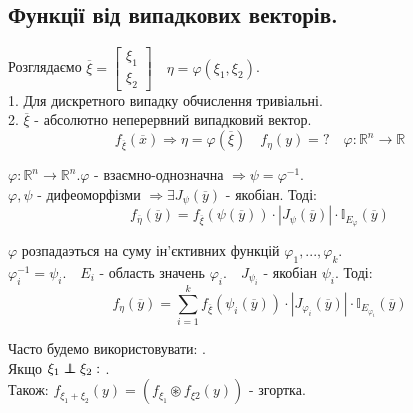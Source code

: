  \subsection{Функції від випадкових векторів.}
 Розглядаємо $ \overline{\xi} = \begin{bmatrix}
  \xi_1 \\
  \xi_2
 \end{bmatrix} \quad \eta = \varphi(\xi_1, \xi_2)$.\\
 1. Для дискретного випадку обчислення тривіальні.\\
 2. $ \overline{\xi} $ - абсолютно неперервний випадковий вектор.
 $$ f_{\overline{\xi}} (\overline{x}) \Rightarrow \eta = \varphi( \overline{\xi}) \quad f_{\eta} (y)=? \quad \varphi: \mathbb{R}^n \to \mathbb{R}$$
\begin{boxteo}
    $ \varphi: \mathbb{R}^n \to \mathbb{R}^n. \varphi$ - взаємно-однозначна $ \Rightarrow \psi = \varphi^{-1}$.\\
    $\varphi, \psi $ - дифеоморфізми $ \Rightarrow  \exists J_{\psi} ( \overline{y}) $ - якобіан. Тоді:
    $$
    f_{\overline{\eta}}  (\overline{y}) = f_{\overline{\xi}} (\psi(\overline{y})) \cdot \left| J_{\psi }(\overline{y}) \right| \cdot   \mathbb{I}_{E_{\varphi}} (\overline{y})
    $$
\end{boxteo}
\begin{boxteo}
    $\varphi$ розпадаэться на суму ін'єктивних функцій  $\varphi_1, ..., \varphi_k$.\\
    $ \varphi^{-1}_i = \psi_i. \quad E_i$ - область значень $ \varphi_i. \quad J_{\psi_i}$ - якобіан $ \psi_i$. Тоді:
    $$
    f_{\eta} (\overline{y}) =  \sum\limits_{i = 1}^{ k}{ f_{\overline{\xi}} ( \psi_i( \overline{y})) \cdot \left| J_{\varphi_i } (\overline{y}) \right|  \cdot \mathbb{I}_{E_{\varphi_i}} (\overline{y})}
    $$
\end{boxteo}
Часто будемо використовувати: .\\
Якщо $ \xi_1 \independent \xi_2: $ .\\ Також: $f_{\xi_1 + \xi_2} (y) = (f_{\xi_1} \circledast f_{\xi2} (y))$ - згортка.
